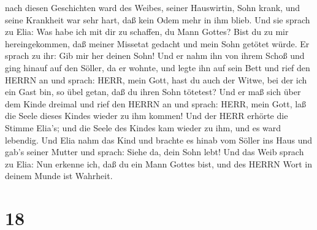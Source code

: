 nach diesen Geschichten ward des Weibes, seiner Hauswirtin, Sohn krank,
und seine Krankheit war sehr hart, daß kein Odem mehr in ihm blieb.
 Und sie sprach zu Elia: Was habe ich mit dir zu schaffen,
du Mann Gottes? Bist du zu mir hereingekommen, daß meiner Missetat
gedacht und mein Sohn getötet würde.  Er sprach zu ihr: Gib
mir her deinen Sohn! Und er nahm ihn von ihrem Schoß und ging hinauf auf
den Söller, da er wohnte, und legte ihn auf sein Bett  und
rief den HERRN an und sprach: HERR, mein Gott, hast du auch der Witwe,
bei der ich ein Gast bin, so übel getan, daß du ihren Sohn tötetest?
 Und er maß sich über dem Kinde dreimal und rief den HERRN
an und sprach: HERR, mein Gott, laß die Seele dieses Kindes wieder zu
ihm kommen!  Und der HERR erhörte die Stimme Elia's; und
die Seele des Kindes kam wieder zu ihm, und es ward lebendig.
 Und Elia nahm das Kind und brachte es hinab vom Söller ins
Haus und gab's seiner Mutter und sprach: Siehe da, dein Sohn lebt!
 Und das Weib sprach zu Elia: Nun erkenne ich, daß du ein
Mann Gottes bist, und des HERRN Wort in deinem Munde ist Wahrheit.

\hypertarget{section-17}{%
\section{18}\label{section-17}}

